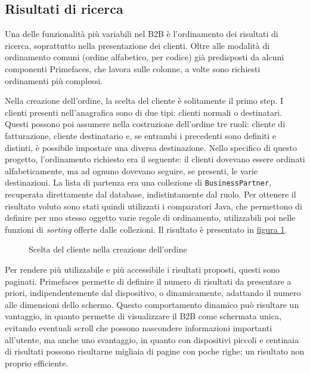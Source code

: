 \subsection{Risultati di ricerca}
Una delle funzionalità più variabili nel B2B è l'ordinamento dei risultati di ricerca, soprattutto nella presentazione dei clienti. Oltre alle modalità di ordinamento comuni (ordine alfabetico, per codice) già predisposti da alcuni componenti Primefaces, che lavora sulle colonne, a volte sono richiesti ordinamenti più complessi.

Nella creazione dell'ordine, la scelta del cliente è solitamente il primo step. I clienti presenti nell'anagrafica sono di due tipi: clienti normali o destinatari. Questi possono poi assumere nella costruzione dell'ordine tre ruoli: cliente di fatturazione, cliente destinatario e, se entrambi i precedenti sono definiti e distinti, è possibile impostare una diversa destinazione. Nello specifico di questo progetto, l'ordinamento richiesto era il seguente: il clienti dovevano essere ordinati alfabeticamente, ma ad ognuno dovevano seguire, se presenti, le varie destinazioni. La lista di partenza era una collezione di \texttt{BusinessPartner}, recuperata direttamente dal database, indistintamente dal ruolo. Per ottenere il risultato voluto sono stati quindi utilizzati i comparatori Java, che permettono di definire per uno stesso oggetto varie regole di ordinamento, utilizzabili poi nelle funzioni di \textit{sorting} offerte dalle collezioni. Il risultato è presentato in \hyperref[fig:listaclienti]{figura \ref{fig:listaclienti}}.
\begin{figure}
	\centering
	\caption{Scelta del cliente nella creazione dell'ordine}
	\label{fig:listaclienti}
\end{figure}

Per rendere più utilizzabile e più accessibile i risultati proposti, questi sono paginati. Primefaces permette di definire il numero di risultati da presentare a priori, indipendentemente dal dispositivo, o dinamicamente, adattando il numero alle dimensioni dello schermo. Questo comportamento dinamico può risultare un vantaggio, in quanto permette di visualizzare il B2B come schermata unica, evitando eventuali scroll che possono nascondere informazioni importanti all'utente, ma anche uno svantaggio, in quanto con dispositivi piccoli e centinaia di risultati possono risultarne migliaia di pagine con poche righe; un risultato non proprio efficiente.

